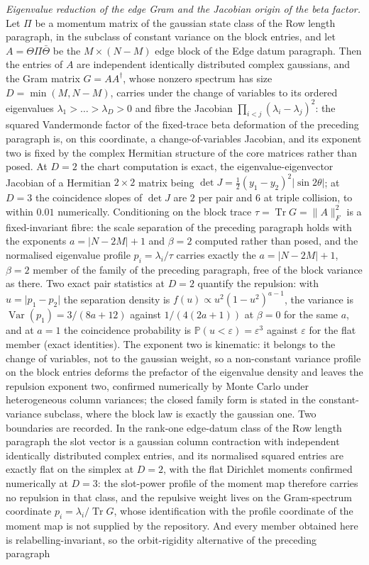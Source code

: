 \emph{Eigenvalue reduction of the edge Gram and the Jacobian origin of the beta factor.} Let \(\Pi\) be a momentum matrix of the gaussian state class of the Row length paragraph, in the subclass of constant variance on the block entries, and let \(A=\Theta\Pi\bar\Theta\) be the \(M\times(N-M)\) edge block of the Edge datum paragraph. Then the entries of \(A\) are independent identically distributed complex gaussians, and the Gram matrix \(G=AA^{\dagger}\), whose nonzero spectrum has size \(D=\min(M,N-M)\), carries under the change of variables to its ordered eigenvalues \(\lambda_{1}>\dots>\lambda_{D}>0\) and fibre the Jacobian \(\prod_{i<j}(\lambda_{i}-\lambda_{j})^{2}\): the squared Vandermonde factor of the fixed-trace beta deformation of the preceding paragraph is, on this coordinate, a change-of-variables Jacobian, and its exponent two is fixed by the complex Hermitian structure of the core matrices rather than posed. At \(D=2\) the chart computation is exact, the eigenvalue-eigenvector Jacobian of a Hermitian \(2\times2\) matrix being \(\det J=\tfrac{1}{2}(y_{1}-y_{2})^{2}\lvert\sin 2\theta\rvert\); at \(D=3\) the coincidence slopes of \(\det J\) are \(2\) per pair and \(6\) at triple collision, to within \(0.01\) numerically. Conditioning on the block trace \(\tau=\operatorname{Tr}G=\lVert A\rVert_{F}^{2}\) is a fixed-invariant fibre: the scale separation of the preceding paragraph holds with the exponents \(a=\lvert N-2M\rvert+1\) and \(\beta=2\) computed rather than posed, and the normalised eigenvalue profile \(p_{i}=\lambda_{i}/\tau\) carries exactly the \(a=\lvert N-2M\rvert+1\), \(\beta=2\) member of the family of the preceding paragraph, free of the block variance as there. Two exact pair statistics at \(D=2\) quantify the repulsion: with \(u=\lvert p_{1}-p_{2}\rvert\) the separation density is \(f(u)\propto u^{2}(1-u^{2})^{a-1}\), the variance is \(\operatorname{Var}(p_{1})=3/(8a+12)\) against \(1/(4(2a+1))\) at \(\beta=0\) for the same \(a\), and at \(a=1\) the coincidence probability is \(\mathbb{P}(u<\varepsilon)=\varepsilon^{3}\) against \(\varepsilon\) for the flat member (exact identities). The exponent two is kinematic: it belongs to the change of variables, not to the gaussian weight, so a non-constant variance profile on the block entries deforms the prefactor of the eigenvalue density and leaves the repulsion exponent two, confirmed numerically by Monte Carlo under heterogeneous column variances; the closed family form is stated in the constant-variance subclass, where the block law is exactly the gaussian one. Two boundaries are recorded. In the rank-one edge-datum class of the Row length paragraph the slot vector is a gaussian column contraction with independent identically distributed complex entries, and its normalised squared entries are exactly flat on the simplex at \(D=2\), with the flat Dirichlet moments confirmed numerically at \(D=3\): the slot-power profile of the moment map therefore carries no repulsion in that class, and the repulsive weight lives on the Gram-spectrum coordinate \(p_{i}=\lambda_{i}/\operatorname{Tr}G\), whose identification with the profile coordinate of the moment map is not supplied by the repository. And every member obtained here is relabelling-invariant, so the orbit-rigidity alternative of the preceding paragraph 